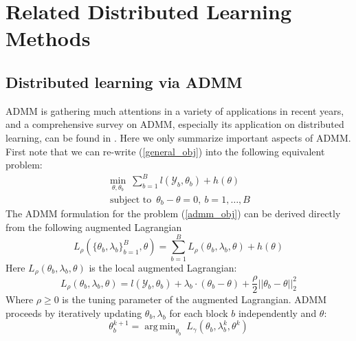 \documentclass{article}
\DeclareMathOperator*{\argmin}{arg\,min}
\DeclareMathOperator*{\st}{subject~to}
\newcommand{\1}[0]{\ensuremath{\boldsymbol{1}}\xspace}
\begin{document}

\section{Related Distributed Learning Methods}

\subsection{Distributed learning via ADMM}
\label{ADMM}
ADMM is gathering much attentions in a variety of applications in recent years, and a comprehensive survey on ADMM, especially its application on distributed learning, can be found in \cite{Boyd10}. Here we only summarize important aspects of ADMM. First note that we can re-write (\ref{general_obj}) into the following equivalent problem:
\begin{equation}\label{admm_obj}
\begin{gathered}
\min_{\theta, \theta_b} ~ \textstyle\sum_{b=1}^Bl(\mathcal{Y}_b,\theta_b) + h(\theta)\\
\st ~ \theta_b - \theta = 0, ~ b = 1,\ldots,B
\end{gathered}
\end{equation}
The ADMM formulation for the problem (\ref{admm_obj}) can be derived directly from the following augmented Lagrangian
\begin{equation}\label{admm_lag_global}
\textstyle L_\rho(\{\theta_b, \lambda_b\}_{b=1}^B, \theta) =  \sum_{b=1}^BL_\rho(\theta_b, \lambda_b, \theta) + h(\theta)
\end{equation}
Here $L_\rho(\theta_b, \lambda_b, \theta)$ is the local augmented Lagrangian:
\begin{equation}\label{admm_lag_local}
\textstyle L_\rho(\theta_b, \lambda_b, \theta)  = l(\mathcal{Y}_b, \theta_b) + \lambda_b\cdot(\theta_b - \theta) + \frac{\rho}{2}||\theta_b - \theta||_2^2
\end{equation}
Where $\rho \ge 0$ is the tuning parameter of the augmented Lagrangian. ADMM proceeds by iteratively updating $\theta_b, \lambda_b$ for each block $b$ independently and $\theta$:
\begin{equation}\label{admm_update_local}
\textstyle \theta_b^{k+1} = \argmin_{\theta_b}~L_\gamma(\theta_b, \lambda_b^k, \theta^k)
\end{equation}
\end{document}
